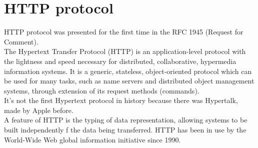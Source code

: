 \chapter{HTTP protocol}
HTTP protocol was presented for the first time in the RFC 1945 (Request for Comment).\\
The Hypertext Transfer Protocol (HTTP) is an application-level protocol with the lightness and speed necessary for distributed, collaborative, hypermedia information systems. It is a generic, stateless, object-oriented protocol which can be used for many tasks, such as name servers and distributed object management systems, through extension of its request methods (commands).\\
It's not the first Hypertext protocol in history because there was Hypertalk, made by Apple before. \\
A feature of HTTP is the typing of data representation, allowing systems to be built independently f the data being transferred. HTTP has been in use by the World-Wide Web global information initiative since 1990.

